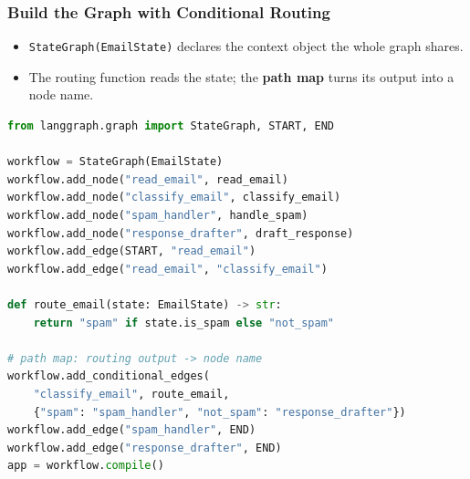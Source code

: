 \begin{frame}[fragile]\frametitle{Build the Graph with Conditional Routing}
      \begin{itemize}
        \item \texttt{StateGraph(EmailState)} declares the context object the whole graph shares.
        \item The routing function reads the state; the \textbf{path map} turns its output into a node name.
      \end{itemize}
\begin{lstlisting}[language=Python, basicstyle=\scriptsize\ttfamily]
from langgraph.graph import StateGraph, START, END

workflow = StateGraph(EmailState)
workflow.add_node("read_email", read_email)
workflow.add_node("classify_email", classify_email)
workflow.add_node("spam_handler", handle_spam)
workflow.add_node("response_drafter", draft_response)
workflow.add_edge(START, "read_email")
workflow.add_edge("read_email", "classify_email")

def route_email(state: EmailState) -> str:
    return "spam" if state.is_spam else "not_spam"

# path map: routing output -> node name
workflow.add_conditional_edges(
    "classify_email", route_email,
    {"spam": "spam_handler", "not_spam": "response_drafter"})
workflow.add_edge("spam_handler", END)
workflow.add_edge("response_drafter", END)
app = workflow.compile()
\end{lstlisting}
\end{frame}
